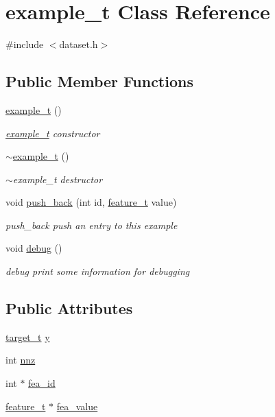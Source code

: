 \hypertarget{classexample__t}{\section{example\+\_\+t Class Reference}
\label{classexample__t}
}


{\ttfamily \#include $<$dataset.\+h$>$}

\subsection*{Public Member Functions}
\begin{DoxyCompactItemize}
\item 
\hyperlink{classexample__t_ad6ddd1b053286b14d8bb559eb9fe823e}{example\+\_\+t} ()
\begin{DoxyCompactList}\small\item\em \hyperlink{classexample__t}{example\+\_\+t} constructor \end{DoxyCompactList}\item 
\hyperlink{classexample__t_afe0ae6b57c07f297caffc89ac1d60d1c}{$\sim$example\+\_\+t} ()
\begin{DoxyCompactList}\small\item\em $\sim$example\+\_\+t destructor \end{DoxyCompactList}\item 
void \hyperlink{classexample__t_ad3fba8e9b56168ee3436a853c18a97a7}{push\+\_\+back} (int id, \hyperlink{dataset_8h_ac2e4791c62a663377be91b0922cede72}{feature\+\_\+t} value)
\begin{DoxyCompactList}\small\item\em push\+\_\+back push an entry to this example \end{DoxyCompactList}\item 
void \hyperlink{classexample__t_a7f7f9e6721dc7e566634c04b9d7b4303}{debug} ()
\begin{DoxyCompactList}\small\item\em debug print some information for debugging \end{DoxyCompactList}\end{DoxyCompactItemize}
\subsection*{Public Attributes}
\begin{DoxyCompactItemize}
\item 
\hyperlink{dataset_8h_a0f180d1f400ce1743488c55eb82a0a49}{target\+\_\+t} \hyperlink{classexample__t_a71bd4c6e68d5eb4543b84c47599e72bb}{y}
\item 
int \hyperlink{classexample__t_a6501a26509c4d186310a5f51c7a9ddf8}{nnz}
\item 
int $\ast$ \hyperlink{classexample__t_a48940c5caff1e78969f1e2c2e7049532}{fea\+\_\+id}
\item 
\hyperlink{dataset_8h_ac2e4791c62a663377be91b0922cede72}{feature\+\_\+t} $\ast$ \hyperlink{classexample__t_acac894d54d087a9a5f27f063003d5b72}{fea\+\_\+value}
\end{DoxyCompactItemize}


